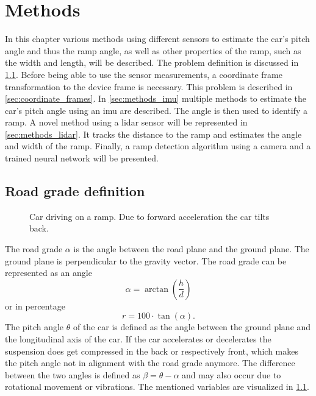 \chapter{Methods}
\label{ch:Methods}
In this chapter various methods using different sensors to estimate the car's pitch angle and thus the ramp angle, as well as other properties of the ramp, such as the width and length, will be described.
The problem definition is discussed in \cref{sec:road_grade_definition}.
Before being able to use the sensor measurements, a coordinate frame transformation to the device frame is necessary.
This problem is described in \cref{sec:coordinate_frames}.
In \cref{sec:methods_imu} multiple methods to estimate the car's pitch angle using an \gls{imu} are described.
The angle is then used to identify a ramp.
A novel method using a \gls{lidar} sensor will be represented in \cref{sec:methods_lidar}.
It tracks the distance to the ramp and estimates the angle and width of the ramp.
Finally, a ramp detection algorithm using a camera and a trained neural network will be presented.


\section{Road grade definition}
\label{sec:road_grade_definition}
\begin{figure}[htb]
	\centering
	
	\caption[Ramp angle definition]{Car driving on a ramp. Due to forward acceleration the car tilts back.}
	\label{fig:tikz_car_tilt}
\end{figure}
The road grade $\alpha$ is the angle between the road plane and the ground plane.
The ground plane is perpendicular to the gravity vector.
The road grade can be represented as an angle
\begin{equation}
	\alpha = \arctan(\frac{h}{d})
\end{equation}
or in percentage
\begin{equation}
	r = 100\cdot\tan(\alpha).
\end{equation}
The pitch angle $\theta$ of the car is defined as the angle between the ground plane and the longitudinal axis of the car.
If the car accelerates or decelerates the suspension does get compressed in the back or respectively front, which makes the pitch angle not in alignment with the road grade anymore.
The difference between the two angles is defined as $\beta = \theta - \alpha$ and may also occur due to rotational movement or vibrations.
The mentioned variables are visualized in \cref{fig:tikz_car_tilt}.



